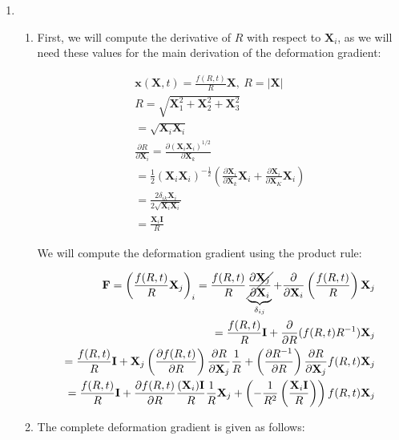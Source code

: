 \begin{problem}
    \noindent
    \normalfont
    \begin{enumerate}
    \item \begin{enumerate}
        \item First, we will compute the derivative of $R$ with respect to $\mathbf{X}_{i}$, as we will need these values for the main derivation of the deformation gradient:

        \begin{align}
        \mathbf{x}(\mathbf{X},t)=\frac{f(R,t)}{R}\mathbf{X}, \ R=\lvert \mathbf{X} \rvert  \\
        R = \sqrt{ \mathbf{X}_{1}^2+\mathbf{X}_{2}^2 +\mathbf{X}_{3}^2}  \\
        =\sqrt{ \mathbf{X}_{i}\mathbf{X}_{i} } \\
        \frac{ \partial R }{ \partial \mathbf{X}_{i} }=\frac{ \partial (\mathbf{X}_{i}\mathbf{X}_{i})^{1/2} }{ \partial \mathbf{X}_{k} }   \\
        =\frac{1}{2}(\mathbf{X}_{i}\mathbf{X}_{i})^{-\frac{1}{2}}\left( \frac{ \partial \mathbf{X}_{i} }{ \partial \mathbf{X}_{k} }  \mathbf{X}_{i}+\frac{ \partial \mathbf{X}_{i} }{ \partial \mathbf{X}_{K} }\mathbf{X}_{i} \right) \\
        =\frac{2\delta_{ik}\mathbf{X}_{i}}{2\sqrt{ \mathbf{X}_{i}\mathbf{X}_{i} }} \\
        =\frac{\mathbf{X}_{i}\mathbf{I}}{R}
        \end{align}
        
        We will compute the deformation gradient using the product rule:
        
        
        \begin{align}
        \mathbf{F}=\left( \frac{f(R,t)}{R}\mathbf{X}_{j} \right)_{i}=\frac{f(R,t)}{R}\underbrace{ \cancel{ \frac{ \partial \mathbf{X}_{j} }{ \partial \mathbf{X}_{i} } } }_{ \delta_{ij} } +\frac{ \partial  }{ \partial \mathbf{X}_{i} }\left( \frac{f(R,t)}{R} \right)\mathbf{X}_{j} \\
        =\frac{f(R,t)}{R}\mathbf{I}+\frac{ \partial  }{ \partial R } (f(R,t)R^{-1})\mathbf{X}_{j} \\
        =\frac{f(R,t)}{R}\mathbf{I}+\mathbf{X}_{j}\left( \frac{ \partial f(R,t) }{ \partial R }  \right)\frac{ \partial R }{ \partial \mathbf{X}_{j} } \frac{1}{R}+\left( \frac{ \partial R^{-1} }{ \partial R }  \right)\frac{ \partial R }{ \partial \mathbf{X}_{j} } f(R,t)\mathbf{X}_{j} \\
        =\frac{f(R,t)}{R}\mathbf{I}+\frac{ \partial f(R,t) }{ \partial R } \frac{(\mathbf{X}_{i})\mathbf{I}}{R} \frac{1}{R}\mathbf{X}_{j}+\left( -\frac{1}{R^2}\left( \frac{\mathbf{X}_{i}\mathbf{I}}{R} \right) \right)f(R,t)\mathbf{X}_{j} \\
        \end{align}
        \item The complete deformation gradient is given as follows:
    

\end{enumerate}
\end{enumerate}
\end{problem}
